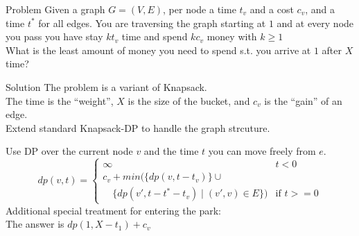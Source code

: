 \begin{slide}
    \begin{block}{Problem}
    	Given a graph $G=(V,E)$, per node a time $t_v$ and a cost $c_v$, and a time $t^*$ for all edges.
		You are traversing the graph starting at $1$ and at every node you pass you have stay $k t_v$ time and spend $k c_v$ money with $k \geq 1$\\
		What is the least amount of money you need to spend s.t. you arrive at $1$ after $X$ time? 
	\end{block}
    \begin{block}{Solution}
        The problem is a variant of Knapsack.\\
		The time is the ``weight'', $X$ is the size of the bucket, and $c_v$ is the ``gain'' of an edge.\\
			Extend standard Knapsack-DP to handle the graph strcuture.
    \end{block}
\end{slide}
\begin{slide}
		Use DP over the current node $v$ and the time $t$ you can move freely from $e$.
		\[
				dp(v,t) = \begin{cases}
							\infty & t < 0\\
							c_v + min \Big(\{dp(v,t-t_v)\} \cup & \\
							\quad \{ dp(v', t-t^*-t_v)\mid (v',v) \in E\} \Big)&\text{if } t >= 0
				\end{cases}
		\]
		Additional special treatment for entering the park:\\
		The answer is $dp(1,X-t_1) + c_v$
\end{slide}
